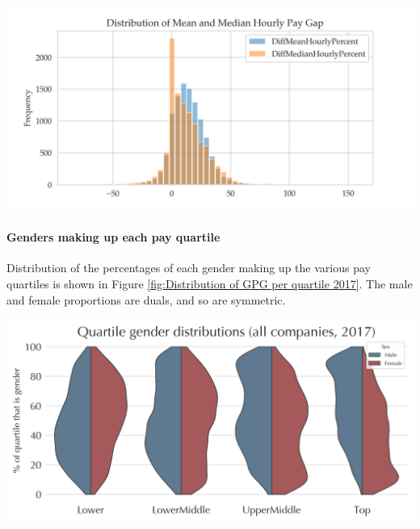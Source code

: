     \begin{centering}
        \includegraphics[width=1\linewidth, scale = 1.7]{images/diff_mean_vs_median.plot.png}
        \label{fig:DiffMedian-DiffMean relation}
    \end{centering}
\vspace{-1.2em}    
\paragraph{Genders making up each pay quartile} 
Distribution of the percentages of each gender making up the various pay quartiles is shown in Figure \ref{fig:Distribution of GPG per quartile 2017}. The male and female proportions are duals, and so are symmetric.
    
\begin{centering}
    \includegraphics[width=0.99\linewidth]{images/2017-all-companies-quartiles.png}
    \label{fig:Distribution of GPG per quartile 2017}
\end{centering}
    
